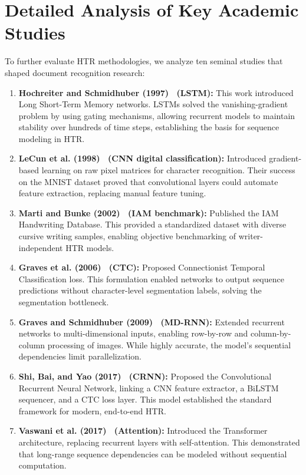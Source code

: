 \section{Detailed Analysis of Key Academic Studies}
To further evaluate HTR methodologies, we analyze ten seminal studies that shaped document recognition research:

\begin{enumerate}
    \item \textbf{Hochreiter and Schmidhuber (1997)~\cite{hochreiter1997long} (LSTM):} This work introduced Long Short-Term Memory networks. LSTMs solved the vanishing-gradient problem by using gating mechanisms, allowing recurrent models to maintain stability over hundreds of time steps, establishing the basis for sequence modeling in HTR.
    \item \textbf{LeCun et al. (1998)~\cite{lecun1998gradient} (CNN digital classification):} Introduced gradient-based learning on raw pixel matrices for character recognition. Their success on the MNIST dataset proved that convolutional layers could automate feature extraction, replacing manual feature tuning.
    \item \textbf{Marti and Bunke (2002)~\cite{marti2002iam} (IAM benchmark):} Published the IAM Handwriting Database. This provided a standardized dataset with diverse cursive writing samples, enabling objective benchmarking of writer-independent HTR models.
    \item \textbf{Graves et al. (2006)~\cite{graves2006connectionist} (CTC):} Proposed Connectionist Temporal Classification loss. This formulation enabled networks to output sequence predictions without character-level segmentation labels, solving the segmentation bottleneck.
    \item \textbf{Graves and Schmidhuber (2009)~\cite{graves2009offline} (MD-RNN):} Extended recurrent networks to multi-dimensional inputs, enabling row-by-row and column-by-column processing of images. While highly accurate, the model's sequential dependencies limit parallelization.
    \item \textbf{Shi, Bai, and Yao (2017)~\cite{shi2017end} (CRNN):} Proposed the Convolutional Recurrent Neural Network, linking a CNN feature extractor, a BiLSTM sequencer, and a CTC loss layer. This model established the standard framework for modern, end-to-end HTR.
    \item \textbf{Vaswani et al. (2017)~\cite{vaswani2017attention} (Attention):} Introduced the Transformer architecture, replacing recurrent layers with self-attention. This demonstrated that long-range sequence dependencies can be modeled without sequential computation.

\end{enumerate}
